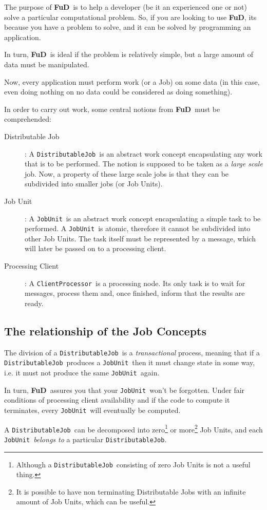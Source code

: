 \documentclass[a4paper,12pt,english]{article}
\newcommand{\fud}{\textbf{FuD}}
\renewcommand{\DJ}{\texttt{DistributableJob}}
\newcommand{\JU}{\texttt{JobUnit}}
\newcommand{\CP}{\texttt{ClientProcessor}}
\begin{document}
The purpose of \fud \ is to help a developer (be it an experienced one or not) solve a particular computational problem. So, if you are looking to use \fud, its because you have a problem to solve, and it can be solved by programming an application.

In turn, \fud \ is ideal if the problem is relatively simple, but a large amount of data must be manipulated.

Now, every application must perform work (or a Job) on some data (in this case, even doing nothing on no data could be considered as doing something).

In order to carry out work, some central notions from \fud \ must be comprehended:
\begin{description}
\item[Distributable Job]: A \DJ \ is an abstract work concept encapsulating any work that is to be performed. The notion is supposed to be taken as a \emph{large scale} job. Now, a property of these large scale jobs is that they can be subdivided into smaller jobs (or Job Units).
\item[Job Unit]: A \JU \ is an abstract work concept encapsulating a simple task to be performed. A \JU \ is atomic, therefore it cannot be subdivided into other Job Units. The task itself must be represented by a message, which will later be passed on to a processing client.
\item[Processing Client]: A \CP \ is a processing node. Its only task is to wait for messages, process them and, once finished, inform that the results are ready.
\end{description}

\subsection{The relationship of the Job Concepts}

The division of a \DJ \ is a \emph{transactional} process, meaning that if a \DJ \ produces a \JU \ then it must change state in some way, i.e. it must not produce the same \JU \ again.

In turn, \fud \ assures you that your \JU \ won't be forgotten. Under fair conditions of processing client availability and if the code to compute it terminates, every \JU \ will eventually be computed.

A \DJ \ can be decomposed into zero\footnote{Although a \DJ \ consisting of zero Job Units is not a useful thing.} or more\footnote{It is possible to have non terminating Distributable Jobs with an infinite amount of Job Units, which can be useful.} Job Units, and each \JU \ \emph{belongs to} a particular \DJ.
\end{document}
